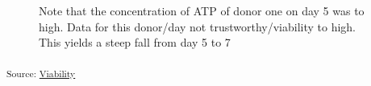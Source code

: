 \documentclass[
  letterpaper,
  DIV=11,
  numbers=noendperiod,
  oneside]{scrartcl}
\begin{document}
\begin{figure}[H]


\caption{\label{fig-viability-relative-overall}Note that the
concentration of ATP of donor one on day 5 was to high. Data for this
donor/day not trustworthy/viability to high. This yields a steep fall
from day 5 to 7}

\end{figure}%

\textsubscript{Source:
\href{https://andreasludvig.github.io/manuscript/notebooks/viability/Viability-preview.html\#cell-fig-viability-relative-overall}{Viability}}

\begin{figure}[H]


\caption{\label{fig-donor-viabilities}}

\end{figure}%
\end{document}
